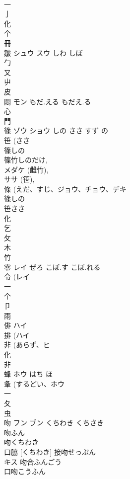 \documentclass[8pt]{extreport}
\begin{document}
\begin{CJK}{UTF8}{min}
\\	一 
\\	亅 
\\	化 
\\	个 
\\	冊 
\\	皺	シュウ スウ	しわ しぼ	
\\	勹 
\\	又 
\\	屮 
\\	皮 
\\	悶	モン	もだ.える もだえ.る	
\\	心 
\\	門 
\\	篠	ゾウ ショウ	しの ささ すず の	
\\	笹 (ささ 
\\	篠しの 
\\	篠竹しのだけ, 
\\	メダケ (雌竹), 
\\	ササ (笹), 
\\	條 (えだ、すじ、ジョウ、チョウ、デキ 
\\	篠しの 
\\	笹ささ 
\\	化 
\\	乞 
\\	攵 
\\	木 
\\	竹 
\\	零	レイ	ぜろ こぼ.す こぼ.れる	
\\	令 (レイ 
\\	一 
\\	个 
\\	卩 
\\	雨 
\\	俳	ハイ		
\\	排 (ハイ 
\\	非 (あらず、ヒ 
\\	化 
\\	非 
\\	蜂	ホウ	はち ほ	
\\	夆 (するどい、ホウ 
\\	一 
\\	夂 
\\	虫 
\\	吻	フン ブン	くちわき くちさき	
\\	吻ふん 
\\	吻くちわき 
\\	口脇 [くちわき] 接吻せっぷん 
\\	キス 吻合ふんごう 
\\	口吻こうふん 

\end{CJK}
\end{document}
